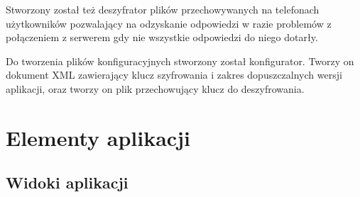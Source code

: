\documentclass{report}
\begin{document}
	Stworzony został też deszyfrator plików przechowywanych na telefonach użytkowników pozwalający na odzyskanie odpowiedzi w razie problemów z połączeniem z serwerem gdy nie wszystkie odpowiedzi do niego dotarły.
	
	Do tworzenia plików konfiguracyjnych stworzony został konfigurator. Tworzy on dokument XML zawierający klucz szyfrowania i zakres dopuszczalnych wersji aplikacji, oraz tworzy on plik przechowujący klucz do deszyfrowania.
	
	\chapter{Elementy aplikacji}
	
		\section{Widoki aplikacji}
		
\end{document}
